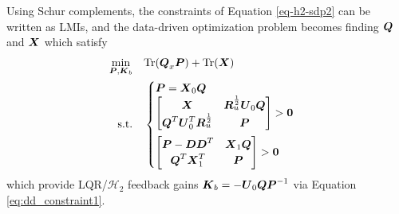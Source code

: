 Using Schur complements, the constraints of Equation \eqref{eq-h2-sdp2} can be written as LMIs, and the data-driven optimization problem becomes finding $\vb*{Q}$ and $\vb*{X}$ which satisfy
\begin{equation}
\label{eq:h2_lmi_dd}
\begin{aligned}
	\underset{\vb*{P}, \vb*{K}_{b}}{\min} \quad & \text{Tr}(\vb*{Q}_{x}\vb*{P}) + \text{Tr}(\vb*{X})\\
	\textrm{s.t.} \quad & \begin{cases}
		\vb*{P} = \vb*{X}_{0}\vb*{Q}\\ \vspace{-15pt}\\
		\begin{bmatrix}
			\vb*{X} & \vb*{R}_{u}^{\frac{1}{2}}\vb*{U}_{0}\vb*{Q}\\
			\vb*{Q}^{T}\vb*{U}_{0}^{T}\vb*{R}_{u}^{\frac{1}{2}} & \vb*{P}\\
		\end{bmatrix} > \vb*{0}\\ \vspace{-10pt}\\
		\begin{bmatrix}
			\vb*{P} - \vb*{D}\vb*{D}^{T} & \vb*{X}_{1}\vb*{Q}\\
			\vb*{Q}^{T}\vb*{X}_{1}^{T} & \vb*{P}\\
		\end{bmatrix} > \vb*{0}
	\end{cases}
\end{aligned}
\end{equation}
which provide LQR/$\mathcal{H}_{2}$ feedback gains $\vb*{K}_{b} = -\vb*{U}_{0}\vb*{Q}\vb*{P}^{-1}$ via Equation \eqref{eq:dd_constraint1}.

